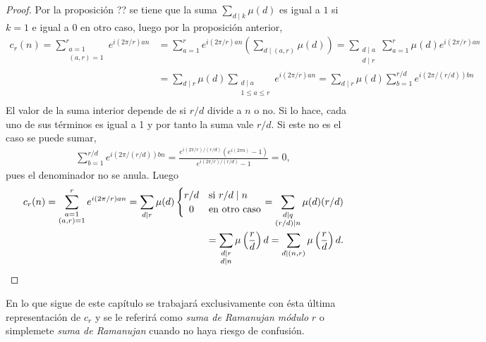 \begin{proof}
Por la proposición ?? se tiene que la suma $\sum_{d \mid k} \mu(d)$ es igual a $1$ si $k=1$ e igual a 0 en otro caso, luego por la proposición anterior,
\begin{align*}
    c_r(n) = \sum_{\substack{a=1 \\ (a,r)=1}}^{r} e^{i(2 \pi/r) a n} & = \sum_{a=1}^{r} e^{i(2 \pi / r) a n} \left( \sum_{d \mid (a,r)} \mu(d) \right) = \sum_{\substack{d \mid a \\ d \mid r}} \sum_{a=1}^{r}  \mu(d) e^{i(2 \pi / r) a n} \\
           & = \sum_{d \mid r} \mu(d) \sum_{\substack{d \mid a \\ 1 \le a \le r}} e^{i(2 \pi / r) a n} = \sum_{d \mid r} \mu(d) \sum_{b=1}^{r/d} e^{i (2 \pi / (r/d)) b n} \\
\end{align*}
El valor de la suma interior depende de si $r/d$ divide a $n$ o no. Si lo hace, cada uno de sus términos es igual a 1 y por tanto la suma vale $r/d$. Si este no es el caso se puede sumar,
\begin{align*}
    \sum_{b=1}^{r/d} e^{i (2 \pi / (r/d)) b n} = \frac{e^{i(2 \pi / r) / (r/d)} (e^{i(2 \pi n)} - 1)}{e^{i(2 \pi / r) / (r/d)} - 1} = 0,
\end{align*}
pues el denominador no se anula. Luego
\begin{align*}
    c_r (n) = \sum_{\substack{a=1 \\ (a,r)=1}}^{r} e^{i(2 \pi/r) a n} = \sum_{d \mid r} \mu(d) \begin{cases}
               \hfil r/d & \text{si } r/d \mid n \\
               \hfil 0 & \text{en otro caso}
           \end{cases} = \sum_{\substack{d \mid q \\ (r/d) \mid n}} \mu(d) (r/d) \\
           = \sum_{\substack{d \mid r \\ d \mid n}} \mu \left( \frac{r}{d} \right) d = \sum_{d \mid (n,r)} \mu \left( \frac{r}{d} \right) d.
\end{align*}
\end{proof}

En lo que sigue de este capítulo se trabajará exclusivamente con ésta última representación de $c_r$ y se le referirá como \emph{suma de Ramanujan módulo} $r$ o simplemete \emph{suma de Ramanujan} cuando no haya riesgo de confusión.

